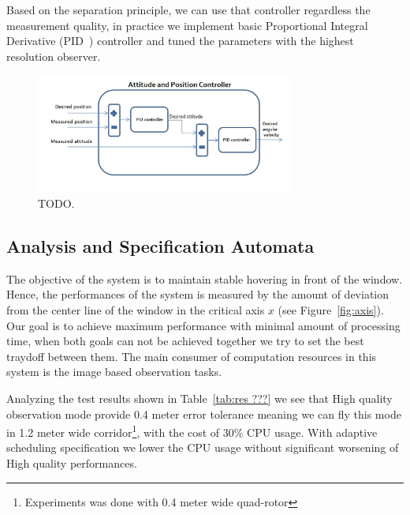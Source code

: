 \documentclass{sig-alternate-ipsn13}
\begin{document}
Based on the separation principle, we can use that controller regardless the measurement quality, in practice we implement basic Proportional Integral Derivative (PID~\cite{aastrom2006advanced}) controller and tuned the parameters with the highest resolution observer.

\begin{figure}[htbp]
    \centerline{\includegraphics[width=85mm]{controller_from_hanoch.jpg}}
    \caption{TODO.}
    \label{fig:controllerStracture}
\end{figure}







\subsection{Analysis and Specification Automata}

The objective of the system is to maintain stable hovering in front of the window. Hence, the performances of the system is measured by the amount of deviation from the center line of the window in the critical axis $x$ (see Figure~\ref{fig:axis}). Our goal is to achieve maximum performance with minimal amount of processing time, when both goals can not be achieved together we try to set the best traydoff between them. The main consumer of computation resources in this system is the image based observation tasks.

Analyzing the test results shown in Table~\ref{tab:res ???} we see that High quality observation mode provide 0.4 meter error tolerance meaning we can fly this mode in 1.2 meter wide corridor\footnote{Experiments was done with 0.4 meter wide quad-rotor}, with the cost of 30\% CPU usage. 
With adaptive scheduling specification we lower the CPU usage without significant worsening of High quality performances.
\end{document}
